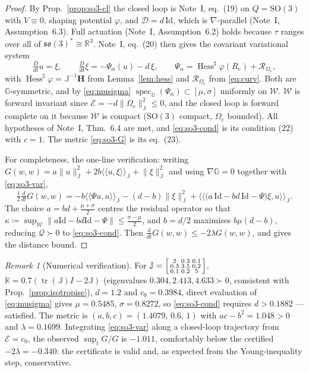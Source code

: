 \documentclass[11pt,a4paper]{article}
\newcommand{\Gm}{\mathbb{G}}
\newcommand{\Rm}{\mathbb{R}}
\newcommand{\Jm}{\mathbb{J}}
\newcommand{\Km}{\mathbb{K}}
\newcommand{\ipJ}[2]{\langle\!\langle #1 , #2 \rangle\!\rangle_{\Jm}}
\newcommand{\Hess}{\operatorname{Hess}}
\newcommand{\Jac}{\mathcal{R}}
\newcommand{\Damp}{\mathcal{D}}
\newcommand{\id}{\mathrm{Id}}
\newcommand{\norm}[1]{\lVert #1 \rVert}
\newcommand{\normJ}[1]{\lVert #1 \rVert_{\Jm}}
\newcommand{\Dt}{\tfrac{D}{dt}}
\newcommand{\so}{\mathfrak{so}(3)}
\newcommand{\SO}{\mathrm{SO}(3)}
\newcommand{\tr}{\operatorname{tr}}
\newcommand{\Ome}{\Omega_{\!e}}
\DeclareMathOperator{\spec}{spec}
\theoremstyle{plain}
\theoremstyle{definition}
\theoremstyle{remark}
\newtheorem{remark}[theorem]{Remark}
\begin{document}
\begin{proof}
By Prop.~\ref{prop:so3-cl} the closed loop is Note~I, eq.~(19) on $Q=\SO$ with
$V\equiv0$, shaping potential $\varphi$, and $\Damp = d\,\id$, which is
$\nabla$-parallel (Note~I, Assumption~6.3). Full actuation
(Note~I, Assumption~6.2) holds because $\tau$ ranges over all of $\so^{*}\cong\Rm^3$.
Note~I, eq.~(20) then gives the covariant variational system
\begin{equation}
  \Dt u = \xi,
  \qquad
  \Dt\xi = -\Psi_\alpha(u) - d\,\xi,
  \qquad
  \Psi_\alpha = \Hess^{\sharp}\varphi(R_e) + \Jac_{\Ome},
  \label{eq:so3-var}
\end{equation}
with $\Hess^{\sharp}\varphi = \Jm^{-1}\mathbf{H}$ from Lemma~\ref{lem:hess} and
$\Jac_{\Ome}$ from \eqref{eq:curv}. Both are $\Gm$-symmetric, and by
\eqref{eq:musigma} $\spec_{\Gm}(\Psi_\alpha)\subset[\mu,\sigma]$ uniformly on
$\mathcal{W}$. $\mathcal{W}$ is forward invariant since
$\dot{\mathcal{E}} = -d\normJ{\Ome}^2\le0$, and the closed loop is forward complete
on it because $\overline{\mathcal{W}}$ is compact ($\SO$ compact, $\Ome$ bounded).
All hypotheses of Note~I, Thm.~6.4 are met, and \eqref{eq:so3-cond} is its
condition (22) with $c=1$. The metric \eqref{eq:so3-G} is its eq.~(23).

For completeness, the one-line verification: writing
$G(w,w) = a\normJ{u}^2 + 2b\ipJ{u}{\xi} + \normJ{\xi}^2$ and using
$\nabla\Gm=0$ together with \eqref{eq:so3-var},
\[
  \tfrac12\tfrac{d}{dt}G(w,w)
  = -b\ipJ{\Psi u}{u} - (d-b)\normJ{\xi}^2
    + \ipJ{\big(a\,\id - bd\,\id - \Psi\big)\xi}{u} .
\]
The choice $a = bd + \tfrac{\mu+\sigma}{2}$ centres the residual operator so that
$\kappa \coloneqq \sup_{\mathcal{W}}\norm{a\id-bd\id-\Psi} \le \tfrac{\sigma-\mu}{2}$,
and $b=d/2$ maximises $b\mu(d-b)$, reducing $\mathcal{Q}\succ0$ to
\eqref{eq:so3-cond}. Then
$\tfrac{d}{dt}G(w,w) \le -2\lambda G(w,w)$, and \cite[Thm.~2.3]{SB13} gives the
distance bound.
\end{proof}

\begin{remark}[Numerical verification]
\label{rem:numeric}
For $\Jm = \begin{bsmallmatrix}2&0.3&0.1\\0.3&3.5&0.2\\0.1&0.2&5\end{bsmallmatrix}$,
$\Km = 0.7(\tr(\Jm)I-2\Jm)$ (eigenvalues $0.304,2.413,4.633 \succ 0$, consistent with
Prop.~\ref{prop:isotropise}), $d=1.2$ and $c_0 = 0.3984$, direct evaluation of
\eqref{eq:musigma} gives $\mu = 0.5485$, $\sigma = 0.8272$, so
\eqref{eq:so3-cond} requires $d > 0.1882$ --- satisfied. The metric is
$(a,b,c) = (1.4079,\,0.6,\,1)$ with $ac-b^2 = 1.048>0$ and $\lambda = 0.1699$.
Integrating \eqref{eq:so3-var} along a closed-loop trajectory from
$\mathcal{E}=c_0$, the observed $\sup_t \dot G/G$ is $-1.011$, comfortably below
the certified $-2\lambda = -0.340$: the certificate is valid and, as expected from
the Young-inequality step, conservative.
\end{remark}
\end{document}
